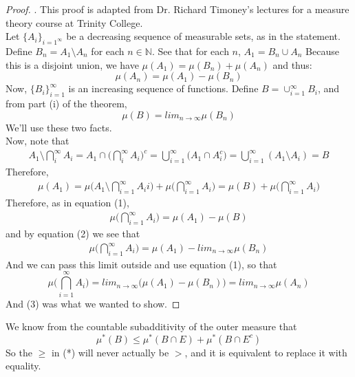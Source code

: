 \documentclass[12pt]{article}
\newenvironment{problem}[2][Problem]{\begin{trivlist}
\item[\hskip \labelsep {\bfseries #1}\hskip \labelsep {\bfseries #2.}]}{\end{trivlist}}
\theoremstyle{definition}
\theoremstyle{definition}
\theoremstyle{definition}
\theoremstyle{definition}
\begin{document}
\begin{problem}{1.20}
\begin{proof}. This proof is adapted from Dr. Richard Timoney's lectures for a measure theory course at Trinity College. \\
Let $\{A_i\}_{i=1^{\infty}}$ be a decreasing sequence of measurable sets, as in the statement. Define $B_n = A_1 \setminus A_n$ for each $n \in \mathbb{N}$. See that for each $n$, $A_1 = B_n \cup A_n$ Because this is a disjoint union, we have $ \mu(A_1) = \mu(B_n) + \mu(A_n)$
and thus:
\begin{equation}
\mu(A_n) = \mu(A_1) - \mu(B_n)
\end{equation}
Now, $\{B_i\}_{i=1}^\infty$ is an increasing sequence of functions. Define $B = \cup_{i=1}^\infty B_i $, and from part (i) of the theorem, 
\begin{equation}
\mu(B) = lim_{n \to \infty} \mu(B_n) 
\end{equation} 
We'll use these two facts. \\
Now, note that \begin{align*}
A_1 \setminus \bigcap^{\infty}_i A_i = A_1 \cap \big(\bigcap^{\infty}_i A_i \big)^c  = \bigcup_{i=1}^\infty \big(A_1 \cap A_i^c\big) = \bigcup_{i=1}^\infty (A_1 \setminus A_i) = B
\end{align*}
Therefore, 
\begin{align*}
\mu(A_1) = \mu\big(A_1 \setminus \bigcap_{i=1}^\infty A_ii \big) + \mu \big(\bigcap_{i=1}^\infty A_i \big) = \mu (B) + \mu \big(\bigcap_{i=1}^\infty A_i \big)
\end{align*}
Therefore, as in equation (1), 
\begin{align*}
\mu\big(\bigcap_{i=1}^\infty A_i\big) = \mu(A_1) - \mu(B)
\end{align*} 
and by equation (2) we see that
\begin{align*}
\mu\big(\bigcap_{i=1}^\infty A_i\big) = \mu(A_1) - lim_{n \to \infty} \mu(B_n)
\end{align*}
And we can pass this limit outside and use equation (1), so that
\begin{equation}
\mu\big(\bigcap_{i=1}^\infty A_i\big) = lim_{n \to \infty} \big( \mu(A_1) - \mu(B_n) \big) = lim_{n \to \infty} \mu(A_n)
\end{equation}
And (3) was what we wanted to show.
\end{proof}
\end{problem}

\begin{problem}{2.10}
We know from the countable subadditivity of the outer measure that 
$$\mu^*(B) \leq \mu^*(B \cap E) + \mu^*(B \cap E^c) $$
So the $\geq$ in (*) will never actually be $>$, and it is equivalent to replace it with equality.
\end{problem}
\end{document}
